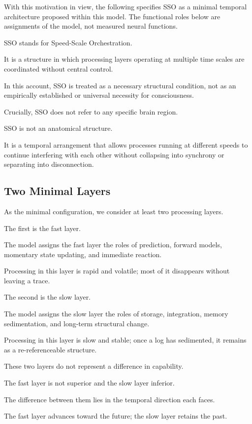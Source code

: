 With this motivation in view, the following specifies SSO as a minimal temporal architecture proposed within this model. The functional roles below are assignments of the model, not measured neural functions.

SSO stands for Speed-Scale Orchestration.

It is a structure in which processing layers operating at multiple time scales are coordinated without central control.

In this account, SSO is treated as a necessary structural condition, not as an empirically established or universal necessity for consciousness.

Crucially, SSO does not refer to any specific brain region.

SSO is not an anatomical structure.

It is a temporal arrangement that allows processes running at different speeds to continue interfering with each other without collapsing into synchrony or separating into disconnection.

\subsection{Two Minimal Layers}


As the minimal configuration, we consider at least two processing layers.

The first is the fast layer.

The model assigns the fast layer the roles of prediction, forward models, momentary state updating, and immediate reaction.

Processing in this layer is rapid and volatile; most of it disappears without leaving a trace.

The second is the slow layer.

The model assigns the slow layer the roles of storage, integration, memory sedimentation, and long-term structural change.

Processing in this layer is slow and stable; once a log has sedimented, it remains as a re-referenceable structure.

These two layers do not represent a difference in capability.

The fast layer is not superior and the slow layer inferior.

The difference between them lies in the temporal direction each faces.

The fast layer advances toward the future; the slow layer retains the past.

